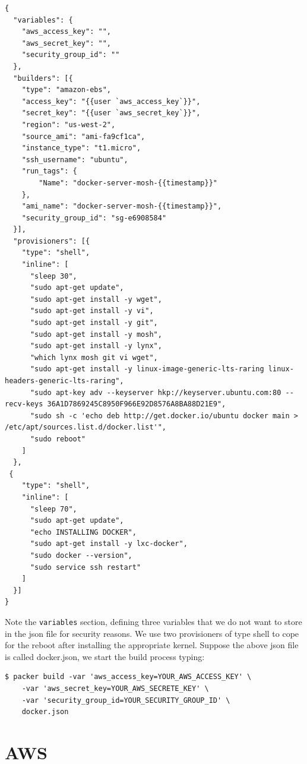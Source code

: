 \documentclass[captions=tableheading]{article}
\begin{document}
\begin{verbatim}
{
  "variables": {
    "aws_access_key": "",
    "aws_secret_key": "",
    "security_group_id": ""
  },
  "builders": [{
    "type": "amazon-ebs",
    "access_key": "{{user `aws_access_key`}}",
    "secret_key": "{{user `aws_secret_key`}}",
    "region": "us-west-2",
    "source_ami": "ami-fa9cf1ca",
    "instance_type": "t1.micro",
    "ssh_username": "ubuntu",
    "run_tags": {
        "Name": "docker-server-mosh-{{timestamp}}"
    },
    "ami_name": "docker-server-mosh-{{timestamp}}",
    "security_group_id": "sg-e6908584"
  }],
  "provisioners": [{
    "type": "shell",
    "inline": [
      "sleep 30",
      "sudo apt-get update",
      "sudo apt-get install -y wget",
      "sudo apt-get install -y vi",
      "sudo apt-get install -y git",
      "sudo apt-get install -y mosh",
      "sudo apt-get install -y lynx",
      "which lynx mosh git vi wget",
      "sudo apt-get install -y linux-image-generic-lts-raring linux-headers-generic-lts-raring",
      "sudo apt-key adv --keyserver hkp://keyserver.ubuntu.com:80 --recv-keys 36A1D7869245C8950F966E92D8576A8BA88D21E9",
      "sudo sh -c 'echo deb http://get.docker.io/ubuntu docker main > /etc/apt/sources.list.d/docker.list'",
      "sudo reboot"
    ]
  },
 {
    "type": "shell",
    "inline": [
      "sleep 70",
      "sudo apt-get update",
      "echo INSTALLING DOCKER",
      "sudo apt-get install -y lxc-docker",
      "sudo docker --version",
      "sudo service ssh restart"
    ]
  }]
}
\end{verbatim}
Note the \texttt{variables} section, defining three variables that we do not want to store in the json file for security reasons. We use two provisioners of type shell to cope for the reboot after installing the appropriate kernel. Suppose the above json file is called docker.json, we start the build process typing:

\begin{verbatim}
$ packer build -var 'aws_access_key=YOUR_AWS_ACCESS_KEY' \ 
    -var 'aws_secret_key=YOUR_AWS_SECRETE_KEY' \
    -var 'security_group_id=YOUR_SECURITY_GROUP_ID' \ 
    docker.json
\end{verbatim}
\section{AWS}
\label{sec-8}
\end{document}
